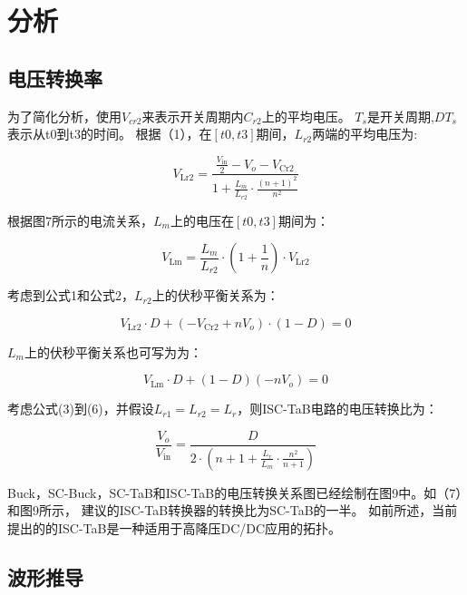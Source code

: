 \documentclass[12pt,a4paper]{report}
\begin{document}
\chapter{分析}
\section{电压转换率}
为了简化分析，使用$V_{cr2}$来表示开关周期内$C_{r2}$上的平均电压。
$T_s$是开关周期,$DT_s$表示从t0到t3的时间。
根据（1），在$[t0,t3]$期间，$L_{r2}$两端的平均电压为:

\begin{equation}
    V_{\mathrm{Lr} 2}=\frac{\frac{V_{\mathrm{in}}}{2}-V_{o}-V_{\mathrm{Cr} 2}}{1+\frac{L_{m}}{L_{r 2}} \cdot \frac{(n+1)^{2}}{n^{2}}}
\end{equation}

根据图7所示的电流关系，$L_m$上的电压在$[t0,t3]$期间为：

\begin{equation}
    V_{\mathrm{Lm}}=\frac{L_{m}}{L_{r 2}} \cdot\left(1+\frac{1}{n}\right) \cdot V_{\mathrm{Lr} 2}
\end{equation}

考虑到公式1和公式2，$L_{r2}$上的伏秒平衡关系为：

\begin{equation}
    V_{\mathrm{Lr} 2} \cdot D+\left(-V_{\mathrm{Cr} 2}+n V_{o}\right) \cdot(1-D)=0
\end{equation}

$L_{m}$上的伏秒平衡关系也可写为为：

\begin{equation}
    V_{\mathrm{Lm}} \cdot D+(1-D)\left(-n V_{o}\right)=0
\end{equation}

考虑公式(3)到(6)，并假设$L_{r 1}=L_{r 2}=L_{r}$，则ISC-TaB电路的电压转换比为：

\begin{equation}
    \frac{V_{o}}{V_{\mathrm{in}}}=\frac{D}{2 \cdot\left(n+1+\frac{L_{r}}{L_{m}} \cdot \frac{n^{2}}{n+1}\right)}
\end{equation}

Buck，SC-Buck，SC-TaB和ISC-TaB的电压转换关系图已经绘制在图9中。如（7）和图9所示，
建议的ISC-TaB转换器的转换比为SC-TaB的一半。 如前所述，当前提出的的ISC-TaB是一种适用于高降压DC/DC应用的拓扑。

\section{波形推导}
\end{document}
